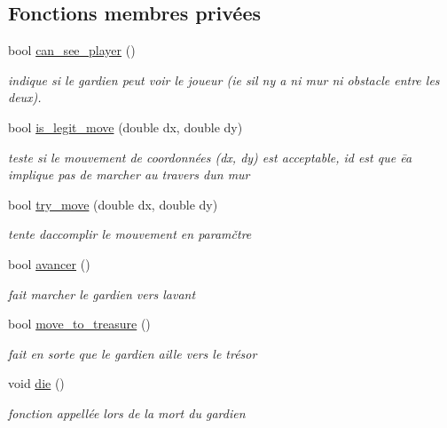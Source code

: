 \subsection*{Fonctions membres privées}
\begin{DoxyCompactItemize}
\item 
bool \hyperlink{classGardien_ab4cae0375789f78258d37ccb16004a4d}{can\+\_\+see\+\_\+player} ()
\begin{DoxyCompactList}\small\item\em indique si le gardien peut voir le joueur (ie s\textquotesingle{}il n\textquotesingle{}y a ni mur ni obstacle entre les deux). \end{DoxyCompactList}\item 
bool \hyperlink{classGardien_aab71ebf5fb9fc0053459bac6bdd0f466}{is\+\_\+legit\+\_\+move} (double dx, double dy)
\begin{DoxyCompactList}\small\item\em teste si le mouvement de coordonnées (dx, dy) est acceptable, id est que ēa implique pas de marcher au travers d\textquotesingle{}un mur \end{DoxyCompactList}\item 
bool \hyperlink{classGardien_a851adaf99e906da7469567829893b8f4}{try\+\_\+move} (double dx, double dy)
\begin{DoxyCompactList}\small\item\em tente d\textquotesingle{}accomplir le mouvement en paramčtre \end{DoxyCompactList}\item 
bool \hyperlink{classGardien_a1ba8ec13ead6e60ab60b9944a89212fc}{avancer} ()
\begin{DoxyCompactList}\small\item\em fait marcher le gardien vers l\textquotesingle{}avant \end{DoxyCompactList}\item 
bool \hyperlink{classGardien_a1661d21c1b1f3155fd626c1af22db4fc}{move\+\_\+to\+\_\+treasure} ()
\begin{DoxyCompactList}\small\item\em fait en sorte que le gardien aille vers le trésor \end{DoxyCompactList}\item 
void \hyperlink{classGardien_a17d57e80bce205161c98c557bb6e7a9c}{die} ()
\begin{DoxyCompactList}\small\item\em fonction appellée lors de la mort du gardien \end{DoxyCompactList}\end{DoxyCompactItemize}
